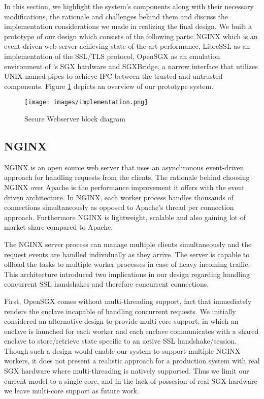 \documentclass[../main.tex]{subfiles}
\begin{document}
In this section, we highlight the system's components along with their
necessary modifications, the rationale and challenges behind them and discuss
the implementation considerations we made in realizing the final design. We
built a prototype of our design which consists of the following parts: NGINX
which is an event-driven web server achieving state-of-the-art performance,
LibreSSL as an implementation of the SSL/TLS protocol, OpenSGX as an emulation
environment of \Intel's SGX hardware and SGXBridge, a narrow interface that
utilizes UNIX named pipes to achieve IPC between the trusted and untrusted
components. Figure \ref{fig:implementation-overview} depicts an overview of our
prototype system.

\begin{figure}[H]
  \centering
  \texttt{[image: images/implementation.png]}
  \caption{Secure Webserver block diagram }
  \label{fig:implementation-overview}
\end{figure}

\subsection{NGINX}

NGINX is an open source web server that uses an asynchronous event-driven
approach for handling requests from the clients. The rationale behind choosing
NGINX over Apache is the performance improvement it offers with the event
driven architecture. In NGINX, each worker process handles thousands of
connections simultaneously as opposed to Apache's thread per connection
approach. Furthermore NGINX is lightweight, scalable and also gaining lot of
market share compared to Apache.

The NGINX server process can manage multiple clients simultaneously and the
request events are handled individually as they arrive. The server is capable
to offload the tasks to multiple worker processes in case of heavy incoming
traffic. This architecture introduced two implications in our design regarding
handling concurrent SSL handshakes and therefore concurrent connections.

First, OpenSGX comes without multi-threading support, fact that immediately
renders the enclave incapable of handling concurrent requests. We initially
considered an alternative design to provide multi-core support, in which an
enclave is launched for each worker and each enclave communicates with a shared
enclave to store/retrieve state specific to an active SSL handshake/session.
Though such a design would enable our system to support multiple NGINX workers,
it does not present a realistic approach for a production system with real SGX
hardware where multi-threading is natively supported. Thus we limit our current
model to a single core, and in the lack of possesion of real SGX hardware we
leave multi-core support as future work.
\end{document}
